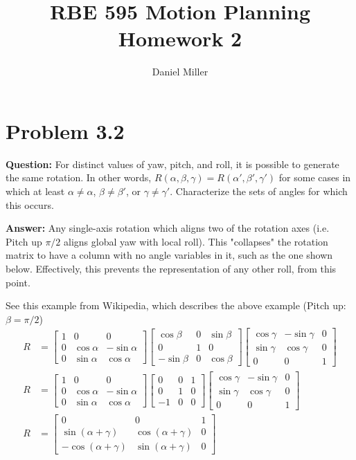 \documentclass[10pt,letterpaper]{article}
\title{RBE 595 Motion Planning \\ \large Homework 2}
\author{Daniel Miller}
\begin{document}
\maketitle

\section{Problem 3.2}
\textbf{Question: } For distinct values of yaw, pitch, and roll, it is possible to generate the same rotation. In other words,  $ R(\alpha,\beta,\gamma) =
R(\alpha',\beta',\gamma')$ for some cases in which at least  $ \alpha
\not = \alpha$,  $ \beta \not = \beta'$, or $ \gamma \not = \gamma'$. Characterize the sets of angles for which this occurs.

\textbf{Answer: } Any single-axis rotation which aligns two of the rotation axes (i.e. Pitch up $\pi/2$ aligns global yaw with local roll). This "collapses" the rotation matrix to have a column with no angle variables in it, such as the one shown below. Effectively, this prevents the representation of any other roll, from this point. 

See this example from Wikipedia, which describes the above example (Pitch up: $\beta = \pi/2$)
\begin{align*}
R &= \begin{bmatrix}
1 & 0 & 0 \\
0 & \cos \alpha & -\sin \alpha \\
0 & \sin \alpha & \cos \alpha \end{bmatrix} \begin{bmatrix}
\cos \beta & 0 & \sin \beta \\
0 & 1 & 0 \\
-\sin \beta & 0 & \cos \beta \end{bmatrix} \begin{bmatrix}
\cos \gamma & -\sin \gamma & 0 \\
\sin \gamma & \cos \gamma & 0 \\
0 & 0 & 1 
\end{bmatrix} \\
R &= \begin{bmatrix}
1 & 0 & 0 \\
0 & \cos \alpha & -\sin \alpha \\
0 & \sin \alpha & \cos \alpha \end{bmatrix} \begin{bmatrix}
0 & 0 & 1 \\
0 & 1 & 0 \\
-1 & 0 & 0 \end{bmatrix} \begin{bmatrix}
\cos \gamma & -\sin \gamma & 0 \\
\sin \gamma & \cos \gamma & 0 \\
0 & 0 & 1 
\end{bmatrix} \\
R &= \begin{bmatrix}
0 & 0 & 1 \\
\sin ( \alpha + \gamma ) & \cos (\alpha + \gamma) & 0 \\
-\cos ( \alpha + \gamma ) & \sin (\alpha + \gamma) & 0 
\end{bmatrix} 
\end{align*}
\end{document}
